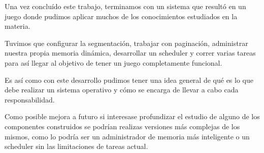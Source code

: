Una vez concluído este trabajo, terminamos con un sistema que resultó en un
juego donde pudimos aplicar muchos de los conocimientos estudiados en la
materia.

Tuvimos que configurar la segmentación, trabajar con paginación, administrar
nuestra propia memoria dinámica, desarrollar un scheduler y correr varias tareas
para así llegar al objetivo de tener un juego completamente funcional.

Es así como con este desarrollo pudimos tener una idea general de qué es lo que
debe realizar un sistema operativo y cómo se encarga de llevar a cabo cada
responsabilidad.

Como posible mejora a futuro si interesase profundizar el estudio de alguno de
los componentes construidos se podrían realizas versiones más complejas de los
mismos, como lo podría ser un administrador de memoria más inteligente o un
scheduler sin las limitaciones de tareas actual.
